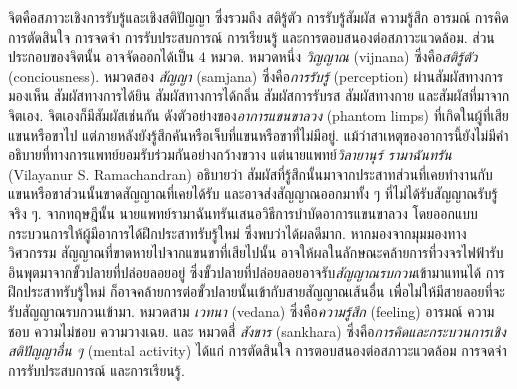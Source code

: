 {\begin{shaded}
		
		จิตคือสภาวะเชิงการรับรู้และเชิงสติปัญญา ซึ่งรวมถึง 
		สติรู้ตัว
		การรับรู้สัมผัส  
		ความรู้สึก อารมณ์ 
		การคิด การตัดสินใจ การจดจำ การรับประสบการณ์ การเรียนรู้ และการตอบสนองต่อสภาวะแวดล้อม.
		ส่วนประกอบของจิตนั้น อาจจัดออกได้เป็น $4$ หมวด.
		หมวดหนึ่ง %
		\textit{วิญญาณ} (vijnana) ซึ่งคือ\textit{สติรู้ตัว} (conciousness).
		หมวดสอง %
		\textit{สัญญา} (samjana) ซึ่งคือ\textit{การรับรู้} (perception) ผ่านสัมผัสทางการมองเห็น สัมผัสทางการได้ยิน สัมผัสทางการได้กลิ่น
		สัมผัสการรับรส สัมผัสทางกาย และสัมผัสที่มาจากจิตเอง.
		จิตเองก็มีสัมผัสเช่นกัน ดังตัวอย่างของ\textit{อาการแขนขาลวง} (phantom limps) ที่เกิดในผู้ที่เสียแขนหรือขาไป แต่ภายหลังยังรู้สึกคันหรือเจ็บที่แขนหรือขาที่ไม่มีอยู่.
		แม้ว่าสาเหตุของอาการนี้ยังไม่มีคำอธิบายที่ทางการแพทย์ยอมรับร่วมกันอย่างกว้างขวาง
		แต่นายแพทย์\textit{วิลายานุร์ รามาฉันทรัน} (Vilayanur S. Ramachandran)
		อธิบายว่า สัมผัสที่รู้สึกนั้นมาจากประสาทส่วนที่เคยทำงานกับแขนหรือขาส่วนนั้นขาดสัญญาณที่เคยได้รับ
		และอาจส่งสัญญาณออกมาทั้ง ๆ ที่ไม่ได้รับสัญญาณรับรู้จริง ๆ.
		จากทฤษฎีนั้น นายแพทย์รามาฉันทรันเสนอวิธีการบำบัดอาการแขนขาลวง
		โดยออกแบบกระบวนการให้ผู้มีอาการได้ฝึกประสาทรับรู้ใหม่ ซึ่งพบว่าได้ผลดีมาก.
		หากมองจากมุมมองทางวิศวกรรม สัญญาณที่ขาดหายไปจากแขนขาที่เสียไปนั้น 
		อาจให้ผลในลักษณะคล้ายการที่วงจรไฟฟ้ารับอินพุตมาจากขั้วปลายที่ปล่อยลอยอยู่
		ซึ่งขั้วปลายที่ปล่อยลอยอาจรับ\textit{สัญญาณรบกวน}เข้ามาแทนได้ 
		การฝึกประสาทรับรู้ใหม่ ก็อาจคล้ายการต่อขั้วปลายนั้นเข้ากับสายสัญญาณเส้นอื่น
		เพื่อไม่ให้มีสายลอยที่จะรับสัญญาณรบกวนเข้ามา.
		หมวดสาม
		\textit{เวทนา} (vedana) ซึ่งคือ\textit{ความรู้สึก} (feeling) อารมณ์ ความชอบ ความไม่ชอบ ความวางเฉย.
		และ
		หมวดสี่ 
		\textit{สังขาร} (sankhara) ซึ่งคือ\textit{การคิดและกระบวนการเชิงสติปัญญาอื่น ๆ} (mental activity) 
		ได้แก่ การตัดสินใจ การตอบสนองต่อสภาวะแวดล้อม การจดจำ การรับประสบการณ์ และการเรียนรู้.
		

\end{shaded}}
